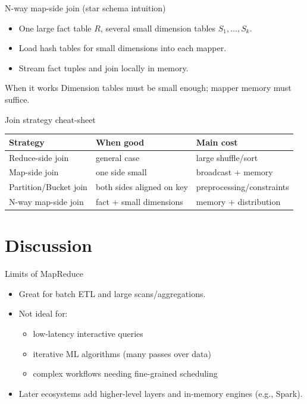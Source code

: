 \documentclass[10pt,aspectratio=169]{beamer}
\newenvironment{examplebox}[1][Example]{\begin{exampleblock}{#1}}{\end{exampleblock}}
\begin{document}
\begin{frame}{N-way map-side join (star schema intuition)}
\begin{itemize}
  \item One large fact table \(R\), several small dimension tables \(S_1,\dots,S_k\).
  \item Load hash tables for small dimensions into each mapper.
  \item Stream fact tuples and join locally in memory.
\end{itemize}
\begin{examplebox}[When it works]
Dimension tables must be small enough; mapper memory must suffice.
\end{examplebox}
\end{frame}

\begin{frame}{Join strategy cheat-sheet}
\begin{tabular}{@{}p{3.2cm}p{5.3cm}p{4.3cm}@{}}
\toprule
\textbf{Strategy} & \textbf{When good} & \textbf{Main cost} \\
\midrule
Reduce-side join & general case & large shuffle/sort \\
Map-side join & one side small & broadcast + memory \\
Partition/Bucket join & both sides aligned on key & preprocessing/constraints \\
N-way map-side join & fact + small dimensions & memory + distribution \\
\bottomrule
\end{tabular}
\end{frame}

\section{Discussion}

\begin{frame}{Limits of MapReduce}
\begin{itemize}
  \item Great for batch ETL and large scans/aggregations.
  \item Not ideal for:
  \begin{itemize}
    \item low-latency interactive queries
    \item iterative ML algorithms (many passes over data)
    \item complex workflows needing fine-grained scheduling
  \end{itemize}
  \item Later ecosystems add higher-level layers and in-memory engines (e.g., Spark).
\end{itemize}
\end{frame}
\end{document}
